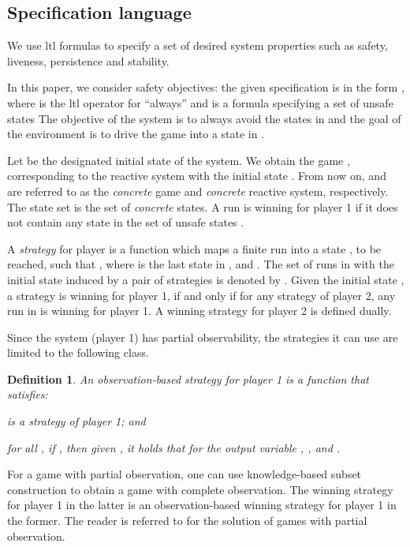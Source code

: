 \documentclass[letterpaper, 10 pt, conference]{ieeeconf}
\newtheorem{definition}{Definition}
\begin{document}
 


\subsection{Specification language}
We use \ac{ltl} formulas \cite{emerson1990temporal} to specify a set
of desired system properties such as safety, liveness, persistence  and
stability.  


In this paper, we consider safety objectives: the given specification
is in the form , where  is the
\ac{ltl} operator for ``always'' and  is a formula
specifying a set of unsafe states  The objective of the system is to always avoid the
states in  and the goal of the environment is to drive the game
into a state in .  


Let  be the designated initial state of the system.  We
obtain the game ,
corresponding to the reactive system  with the initial
state .  From now on,  and  are
referred to as the \emph{concrete} game and \emph{concrete} reactive
system, respectively. The state set  is the set of \emph{concrete}
states.  
A run  is winning for player 1 if it does not 
contain any state in the set of unsafe states .


A \emph{strategy} for player  is a function  which maps a finite run  into a state
, to be reached, such that , where  is the last
state in ,  and . The set of runs in  with the
initial state  induced by a pair of strategies 
is denoted by .  Given the initial state , a
strategy  is winning for player 1, if and only if for any
strategy  of player 2, any run in  is winning
for player 1. A winning strategy for player 2 is defined dually.

Since the system (player 1) has partial observability, the strategies
it can use are limited to the following class.
\begin{definition}
  An \emph{observation-based} strategy for player 1 is a function
   that satisfies: \begin{inparaenum}[(1)]
\item  is a strategy of player 1; and 
\item for all , if , then given
  , it holds that for the output variable , , and .
\end{inparaenum}
\end{definition}
For a game with partial observation, one can use knowledge-based subset
construction to obtain a game with complete observation. The winning
strategy for player 1 in the latter is an observation-based winning
strategy for player 1 in the former. The reader is referred to
\cite{chatterjee2006algorithm} for the solution of games with partial observation.
\end{document}
